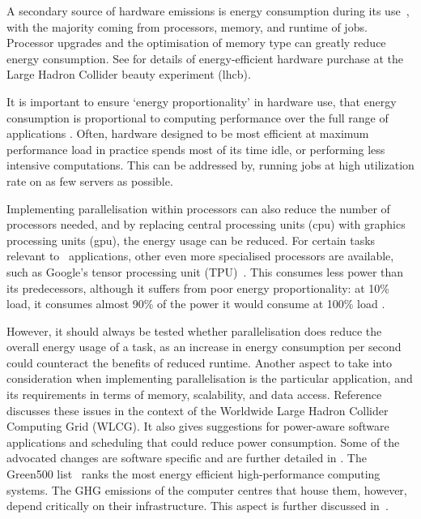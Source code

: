 \documentclass[../SustainableHEP.tex]{subfiles}
\begin{document}
A secondary source of hardware emissions is energy consumption during its use~\cite{Greenpeace_Oeko}, with the majority coming from processors, memory, and runtime of jobs.  Processor upgrades and the optimisation of memory type can greatly reduce energy consumption. See  for details of energy-efficient hardware purchase at the Large Hadron Collider beauty experiment (\acrshort{lhcb}).

It is important to ensure `energy proportionality' in hardware use, \ie that energy consumption is proportional to computing performance over the full range of applications \cite{energy-prop-computing}.    Often, hardware designed to be most efficient at maximum performance load in practice spends most of its time idle, or performing less intensive computations. This can be addressed by, \eg running jobs at high utilization rate on as few servers as possible.  

Implementing parallelisation within processors can also reduce the number of processors needed, and by replacing central processing units (\acrshort{cpu}) with graphics processing units (\acrshort{gpu}), the energy usage can be reduced.  For certain tasks relevant to \ACR\ applications, other even more specialised processors are available, such as Google's tensor processing unit (TPU)~\cite{Tensor}.  This consumes less power than its predecessors, although it suffers from poor energy proportionality: at 10\% load, it consumes almost 90\% of the power it would consume at 100\% load \cite{TensorPerformance}.

However, it should always be tested whether parallelisation does reduce the overall energy usage of a task, as an increase in energy consumption per second could counteract the benefits of reduced runtime.  Another aspect to take into consideration when implementing parallelisation is the particular application, and its requirements in terms of memory, scalability, and data access. Reference~\cite{Abdurachmanov:2014xka} discusses these issues in the context of the Worldwide Large Hadron Collider Computing Grid (WLCG).  It also gives suggestions for power-aware software applications and scheduling that could reduce power consumption.  Some of the advocated changes are software specific and are further detailed in . The Green500 list~\cite{GreenList} ranks the most energy efficient high-performance computing systems. 
The GHG emissions of the computer centres that house them, however, depend critically on their infrastructure. This aspect is further discussed in~.
\end{document}
